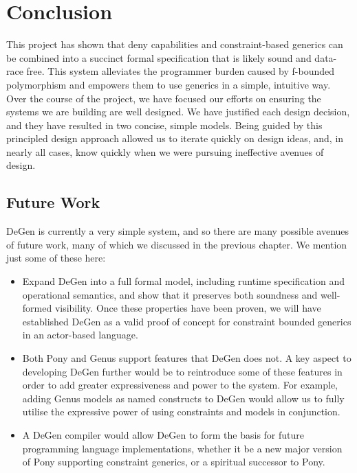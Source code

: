 \chapter{Conclusion}

This project has shown that deny capabilities and constraint-based generics can be combined into a succinct formal specification that is likely sound and data-race free. This system alleviates the programmer burden caused by f-bounded polymorphism and empowers them to use generics in a simple, intuitive way.  \\

Over the course of the project, we have focused our efforts on ensuring the systems we are building are well designed. We have justified each design decision, and they have resulted in two concise, simple models. Being guided by this principled design approach allowed us to iterate quickly on design ideas, and, in nearly all cases, know quickly when we were pursuing ineffective avenues of design. \\

\section{Future Work}

DeGen is currently a very simple system, and so there are many possible avenues of future work, many of which we discussed in the previous chapter. We mention just some of these here:

\begin{itemize}
    \item Expand DeGen into a full formal model, including runtime specification and operational semantics, and show that it preserves both soundness and well-formed visibility. Once these properties have been proven, we will have established DeGen as a valid proof of concept for constraint bounded generics in an actor-based language.
    \item Both Pony and Genus support features that DeGen does not. A key aspect to developing DeGen further would be to reintroduce some of these features in order to add greater expressiveness and power to the system. For example, adding Genus models as named constructs to DeGen would allow us to fully utilise the expressive power of using constraints and models in conjunction.
    \item A DeGen compiler would allow DeGen to form the basis for future programming language implementations, whether it be a new major version of Pony supporting constraint generics, or a spiritual successor to Pony.
\end{itemize}

